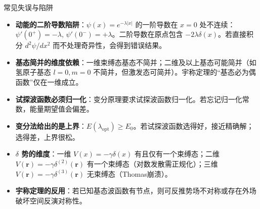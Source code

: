 \begin{errorbox}{常见失误与陷阱}
\begin{itemize}
    \item \textbf{动能的二阶导数陷阱}：$\psi(x)=e^{-\lambda|x|}$ 的一阶导数在 $x=0$ 处不连续：$\psi'(0^+)=-\lambda$, $\psi'(0^-)=+\lambda$。二阶导数在原点包含 $-2\lambda\delta(x)$。若直接积分 $d^2\psi/dx^2$ 而不处理奇异性，会得到错误结果。
    \item \textbf{基态简并的维度依赖}：一维束缚态基态不简并；二维及以上基态可能简并（如氢原子基态 $l=0,m=0$ 不简并，但激发态可简并）。宇称定理的``基态必为偶函数''仅在一维成立。
    \item \textbf{试探波函数必须归一化}：变分原理要求试探波函数归一化。若忘记归一化常数，能量期望值会偏差。
    \item \textbf{变分法给出的是上界}：$E(\lambda_{\text{opt}})\geq E_0$。若试探波函数选得好，接近精确解；选得差，上界很松。
    \item \textbf{$\delta$ 势的维度}：一维 $V(x)=-\gamma\delta(x)$ 有且仅有一个束缚态；二维 $V(\mathbf{r})=-\gamma\delta^{(2)}(\mathbf{r})$ 有一个束缚态（对数发散需正规化）；三维 $V(\mathbf{r})=-\gamma\delta^{(3)}(\mathbf{r})$ 无束缚态（Thomas崩溃）。
    \item \textbf{宇称定理的反用}：若已知基态波函数有节点，则可反推势场不对称或存在外场破坏空间反演对称性。
\end{itemize}
\end{errorbox}

